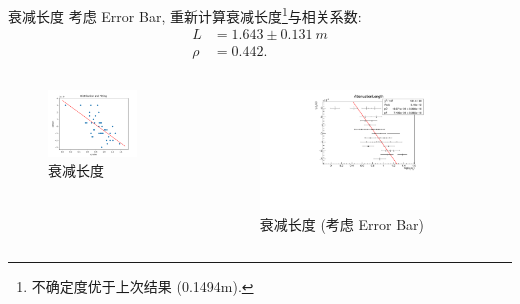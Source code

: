 \documentclass[10pt]{beamer}
\begin{document}
\begin{frame}[label={sec:orgfcb3e5f}]{衰减长度}
考虑 Error Bar, 重新计算衰减长度\footnote{不确定度优于上次结果 (0.1494m).}与相关系数:
\begin{align}
\label{eq:3}
L &= 1.643 \pm \qty{0.131}{m} \\
\rho &= 0.442.
\end{align}

\begin{columns}
\begin{column}{0.5\columnwidth}
\begin{figure}[htbp]
\centering
\includegraphics[width=0.8\textwidth]{../../DetectorPerform/AttenuationLength/figs/Dist.png}
\caption{衰减长度}
\end{figure}
\end{column}

\begin{column}{0.5\columnwidth}
\begin{figure}[htbp]
\centering
\includegraphics[width=0.8\textwidth]{../../DetectorPerform/AttenuationLength/figs/AttenuationLength.pdf}
\caption{衰减长度 (考虑 Error Bar)}
\end{figure}
\end{column}
\end{columns}
\end{frame}
\end{document}
